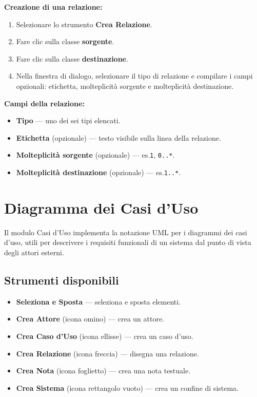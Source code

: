 \documentclass[a4paper,11pt]{article}
\newcommand{\uielement}[1]{\textbf{#1}}
\begin{document}
\textbf{Creazione di una relazione:}
\begin{enumerate}
  \item Selezionare lo strumento \uielement{Crea Relazione}.
  \item Fare clic sulla classe \textbf{sorgente}.
  \item Fare clic sulla classe \textbf{destinazione}.
  \item Nella finestra di dialogo, selezionare il tipo di relazione e compilare
        i campi opzionali: etichetta, molteplicità sorgente e molteplicità destinazione.
\end{enumerate}

\textbf{Campi della relazione:}
\begin{itemize}
  \item \textbf{Tipo} --- uno dei sei tipi elencati.
  \item \textbf{Etichetta} (opzionale) --- testo visibile sulla linea della relazione.
  \item \textbf{Molteplicità sorgente} (opzionale) --- es.\@ \texttt{1}, \texttt{0..*}.
  \item \textbf{Molteplicità destinazione} (opzionale) --- es.\@ \texttt{1..*}.
\end{itemize}

\section{Diagramma dei Casi d'Uso}
\label{sec:usecase}

Il modulo Casi d'Uso implementa la notazione UML per i diagrammi dei casi d'uso, utili per
descrivere i requisiti funzionali di un sistema dal punto di vista degli attori esterni.

\subsection{Strumenti disponibili}

\begin{itemize}
  \item \uielement{Seleziona e Sposta} --- seleziona e sposta elementi.
  \item \uielement{Crea Attore} (icona omino) --- crea un attore.
  \item \uielement{Crea Caso d'Uso} (icona ellisse) --- crea un caso d'uso.
  \item \uielement{Crea Relazione} (icona freccia) --- disegna una relazione.
  \item \uielement{Crea Nota} (icona foglietto) --- crea una nota testuale.
  \item \uielement{Crea Sistema} (icona rettangolo vuoto) --- crea un confine di sistema.
\end{itemize}
\end{document}
